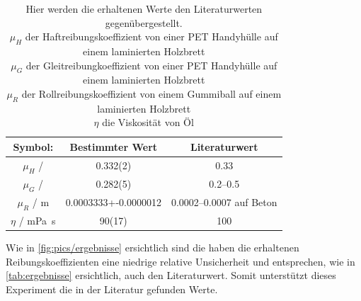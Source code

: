 \documentclass[11pt,ngerman]{scrartcl}
\begin{document}
\begin{table}[H]
    \centering
    \caption{Hier werden die erhaltenen Werte den Literaturwerten gegenübergestellt.\\
    $\mu_H$ der Haftreibungskoeffizient von einer PET Handyhülle auf einem laminierten Holzbrett\\ 
    $\mu_G$ der Gleitreibungkoeffizient von einer PET Handyhülle auf einem laminierten Holzbrett\\
    $\mu_R$ der Rollreibungskoeffizient von einem Gummiball auf einem laminierten Holzbrett\\
    $\eta$ die Viskosität von Öl\\
    }
    \label{tab:ergebnisse}
    \begin{tabular}{c|S[table-format=2.7(7)]|S}
        Symbol:                   & {Bestimmter Wert}                  & {Literaturwert}           \\ \hline
        $\mu_H$ /                 & 0.332(2) & 0.33  \cite{Kurdi2018}    \\
        $\mu_G$ /                 & 0.282(5) & \numrange{0.2}{0.5}	\cite{gleitreibung_pet} \cite{Filippova2016}  \\
        $\mu_R$ / \si{\meter}     & 0.0003333+-0.0000012 & {\numrange{0.0002}{0.0007} auf Beton} \cite{Rollwiderstandgummi2021}     \\
        $\eta$ / \si{\milli\Pa\second} & 90(17) & 100 \cite{viskositatöl2021}   \\
    \end{tabular}
\end{table}

Wie in \autoref{fig:pics/ergebnisse} ersichtlich sind die haben die erhaltenen Reibungskoeffizienten eine
niedrige relative Unsicherheit und entsprechen, wie in \autoref{tab:ergebnisse} ersichtlich, auch
den Literaturwert. Somit unterstützt dieses Experiment die in der Literatur gefunden Werte.
\end{document}
